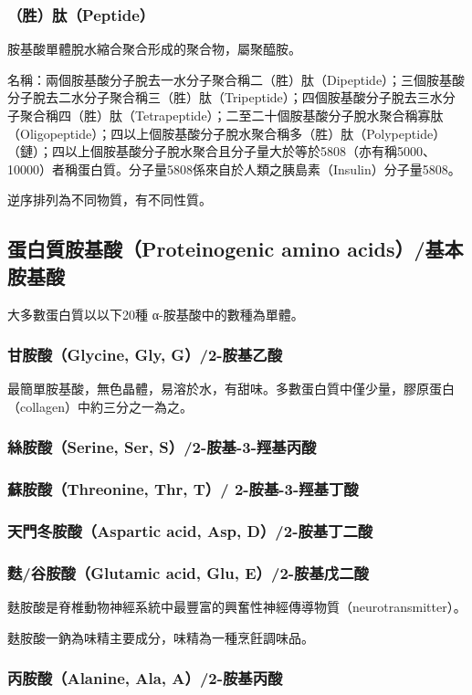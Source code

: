 \documentclass[a4paper,12pt]{report}
\begin{document}
\begin{itemize}
\begin{itemize}
\subsubsection{（胜）肽（Peptide）}
胺基酸單體脫水縮合聚合形成的聚合物，屬聚醯胺。

名稱：兩個胺基酸分子脫去一水分子聚合稱二（胜）肽（Dipeptide）；三個胺基酸分子脫去二水分子聚合稱三（胜）肽（Tripeptide）；四個胺基酸分子脫去三水分子聚合稱四（胜）肽（Tetrapeptide）；二至二十個胺基酸分子脫水聚合稱寡肽（Oligopeptide）；四以上個胺基酸分子脫水聚合稱多（胜）肽（Polypeptide）（鏈）；四以上個胺基酸分子脫水聚合且分子量大於等於5808（亦有稱5000、10000）者稱蛋白質。分子量5808係來自於人類之胰島素（Insulin）分子量5808。

逆序排列為不同物質，有不同性質。
\subsection{蛋白質胺基酸（Proteinogenic amino acids）/基本胺基酸}
大多數蛋白質以以下20種 α-胺基酸中的數種為單體。
\subsubsection{甘胺酸（Glycine, Gly, G）/2-胺基乙酸}
最簡單胺基酸，無色晶體，易溶於水，有甜味。多數蛋白質中僅少量，膠原蛋白（collagen）中約三分之一為之。
\subsubsection{絲胺酸（Serine, Ser, S）/2-胺基-3-羥基丙酸}
\subsubsection{蘇胺酸（Threonine, Thr, T）/
2-胺基-3-羥基丁酸}
\subsubsection{天門冬胺酸（Aspartic acid, Asp, D）/2-胺基丁二酸}
\subsubsection{麩/谷胺酸（Glutamic acid, Glu, E）/2-胺基戊二酸}
麩胺酸是脊椎動物神經系統中最豐富的興奮性神經傳導物質（neurotransmitter）。

麩胺酸一鈉為味精主要成分，味精為一種烹飪調味品。
\subsubsection{丙胺酸（Alanine, Ala, A）/2-胺基丙酸}

\end{itemize}
\end{itemize}
\end{document}
